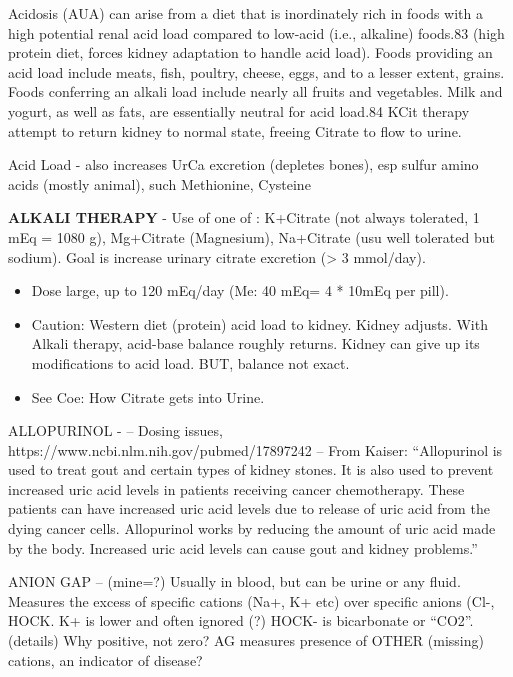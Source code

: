 Acidosis (AUA) can arise from a diet that is inordinately rich in foods
with a high potential renal acid load compared to low-acid (i.e.,
alkaline) foods.83 (high protein diet, forces kidney adaptation to
handle acid load). Foods providing an acid load include meats, fish,
poultry, cheese, eggs, and to a lesser extent, grains. Foods conferring
an alkali load include nearly all fruits and vegetables. Milk and
yogurt, as well as fats, are essentially neutral for acid load.84 KCit
therapy attempt to return kidney to normal state, freeing Citrate to
flow to urine.

Acid Load - also increases UrCa excretion (depletes bones), esp sulfur
amino acids (mostly animal), such Methionine, Cysteine

\textbf{ALKALI THERAPY} - Use of one of : K+Citrate (not always
tolerated, 1 mEq = 1080 g), Mg+Citrate (Magnesium), Na+Citrate (usu well
tolerated but sodium). Goal is increase urinary citrate excretion
(\textgreater{} 3 mmol/day).

\begin{itemize}
\tightlist
\item
  Dose large, up to 120 mEq/day (Me: 40 mEq= 4 * 10mEq per pill).
\item
  Caution: Western diet (protein) acid load to kidney. Kidney adjusts.
  With Alkali therapy, acid-base balance roughly returns. Kidney can
  give up its modifications to acid load. BUT, balance not exact.\\
\item
  See Coe: How Citrate gets into Urine.
\end{itemize}

ALLOPURINOL - -- Dosing issues,
https://www.ncbi.nlm.nih.gov/pubmed/17897242 -- From Kaiser:
``Allopurinol is used to treat gout and certain types of kidney stones.
It is also used to prevent increased uric acid levels in patients
receiving cancer chemotherapy. These patients can have increased uric
acid levels due to release of uric acid from the dying cancer cells.
Allopurinol works by reducing the amount of uric acid made by the body.
Increased uric acid levels can cause gout and kidney problems.''

ANION GAP -- (mine=?) Usually in blood, but can be urine or any fluid.
Measures the excess of specific cations (Na+, K+ etc) over specific
anions (Cl-, HOCK. K+ is lower and often ignored (?) HOCK- is
bicarbonate or ``CO2''. (details) Why positive, not zero? AG measures
presence of OTHER (missing) cations, an indicator of disease?

